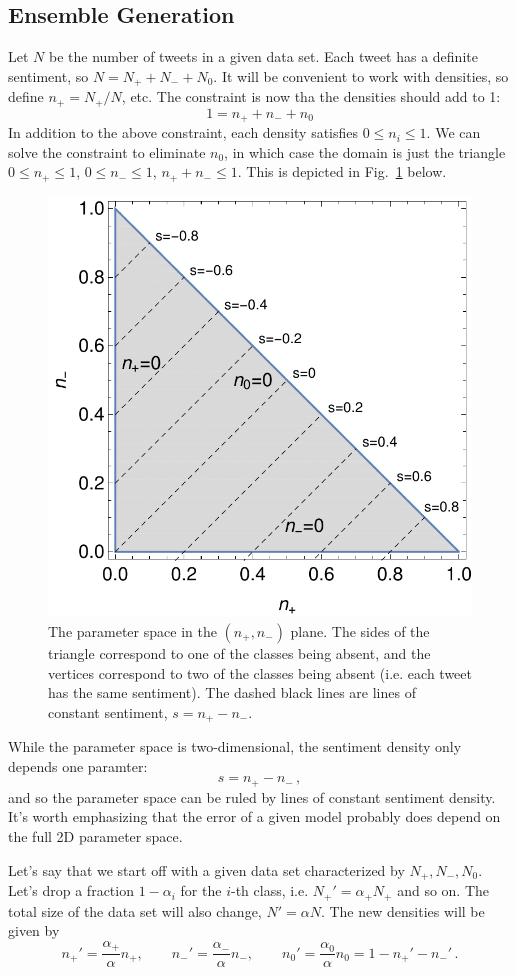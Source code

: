\documentclass[a4paper,12pt]{article}
\begin{document}
\subsection{Ensemble Generation}
Let $N$ be the number of tweets in a given data set. Each tweet has a definite sentiment, so $N = N_+ + N_- + N_0$. It will be convenient to work with densities, so define $n_+ = N_+/N$, etc. The constraint is now tha the densities should add to 1:
\begin{equation}
1 = n_+ + n_- + n_0
\end{equation}
In addition to the above constraint, each density satisfies $0 \le n_i \le 1$. We can solve the constraint to eliminate $n_0$, in which case the domain is just the triangle $0\le n_+ \le 1$, $0 \le n_- \le 1$, $n_+ + n_- \le 1$. This is depicted in Fig.~\ref{fig:paramspace} below.

\begin{figure}[ht]
\centering
\includegraphics[width=.5\textwidth]{Figures/paramspace.pdf}
\captionsetup{width=0.8\textwidth}
\caption{The parameter space in the $(n_+, n_-)$ plane. The sides of the triangle correspond to one of the classes being absent, and the vertices correspond to two of the classes being absent (i.e. each tweet has the same sentiment). The dashed black lines are lines of constant sentiment, $s = n_+ - n_-$.}
\label{fig:paramspace}
\end{figure}  
While the parameter space is two-dimensional, the sentiment density only depends one paramter:
\begin{equation}
s = n_+ - n_- \, ,
\end{equation}
and so the parameter space can be ruled by lines of constant sentiment density. It's worth emphasizing that the error of a given model probably does depend on the full 2D parameter space.

Let's say that we start off with a given data set characterized by $N_+, N_-, N_0$. Let's drop a fraction $1-\alpha_i$ for the $i$-th class, i.e. $N_+' = \alpha_+ N_+$ and so on. The total size of the data set will also change, $N' = \alpha N$. The new densities will be given by
\begin{equation}
n_+' = \frac{\alpha_+}{\alpha} n_+, \qquad n_-' = \frac{\alpha_-}{\alpha} n_-, \qquad n_0' = \frac{\alpha_0}{\alpha} n_0 = 1 - n_+' - n_-'  \, .
\end{equation} 
\end{document}
